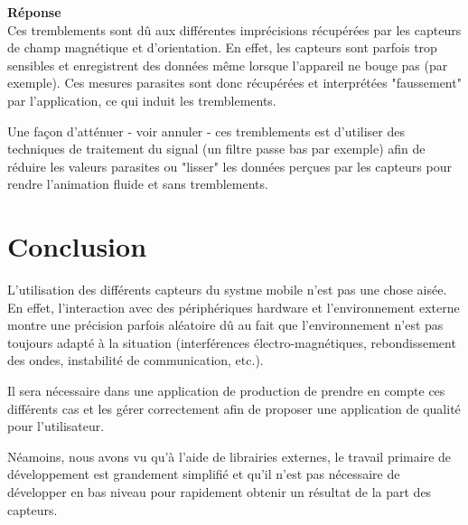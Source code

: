 \documentclass[a4paper]{article}
\begin{document}
\begin{enumerate}
    \textbf{Réponse} \\
    Ces tremblements sont dû aux différentes imprécisions récupérées par les capteurs de champ magnétique et d'orientation. En effet, les capteurs sont parfois trop sensibles et enregistrent des données même lorsque l'appareil ne bouge pas (par exemple). Ces mesures parasites sont donc récupérées et interprétées "faussement" par l'application, ce qui induit les tremblements.
    
    Une façon d'atténuer - voir annuler - ces tremblements est d'utiliser des techniques de traitement du signal (un filtre passe bas par exemple) afin de réduire les valeurs parasites ou "lisser" les données perçues par les capteurs pour rendre l'animation fluide et sans tremblements.
    
\end{enumerate}

\section{Conclusion}

L'utilisation des différents capteurs du systme mobile n'est pas une chose aisée. En effet, l'interaction avec des périphériques hardware et l'environnement externe montre une précision parfois aléatoire dû au fait que l'environnement n'est pas toujours adapté à la situation (interférences électro-magnétiques, rebondissement des ondes, instabilité de communication, etc.).

Il sera nécessaire dans une application de production de prendre en compte ces différents cas et les gérer correctement afin de proposer une application de qualité pour l'utilisateur.

Néamoins, nous avons vu qu'à l'aide de librairies externes, le travail primaire de développement est grandement simplifié et qu'il n'est pas nécessaire de développer en bas niveau pour rapidement obtenir un résultat de la part des capteurs.
\end{document}
